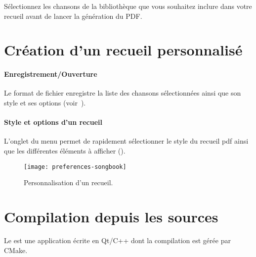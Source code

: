 Sélectionnez les chansons de la bibliothèque que vous souhaitez
inclure dans votre recueil avant de lancer la génération du PDF.


\section{Création d'un recueil personnalisé}

\paragraph{Enregistrement/Ouverture}
Le format de fichier  enregistre la liste des chansons
sélectionnées ainsi que son style et ses options
(voir~).

\paragraph{Style et options d'un recueil}
L'onglet  du menu  permet
de rapidement sélectionner le style du recueil pdf ainsi que les
différentes éléments à afficher ().

\begin{figure}
  \centering
  \texttt{[image: preferences-songbook]}
  \caption{Personnalisation d'un recueil.}
  \label{fig:preferences-songbook}
\end{figure}

\section{Compilation depuis les sources}

Le \client{} est une application écrite en Qt/C++ dont la compilation
est gérée par CMake.

\subsection{\linux}

